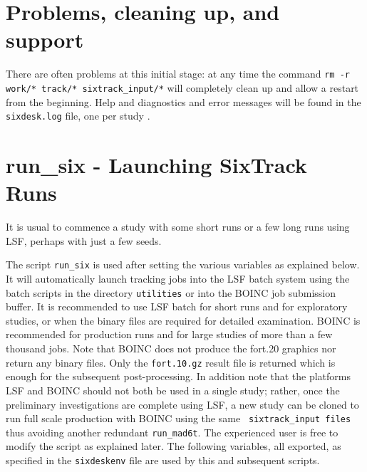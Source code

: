 \documentclass{cernatsnote}
\begin{document}
\section{Problems, cleaning up, and support}

There are often problems at this initial stage: at any time the command {\tt rm
-r work/* track/* sixtrack\_input/*} will completely clean up and allow a
restart from the beginning. Help and diagnostics and error messages will be
found in the {\tt sixdesk.log} file, one per study \footnotemark.

\section{run\_six - Launching SixTrack Runs}
%
\label{sec:run_six}
It is usual to commence a study with some short runs or a few long runs using
LSF, perhaps with just a few seeds.

The script {\tt run\_six} is used after setting the various variables as
explained below.  It will automatically launch tracking jobs into the LSF batch
system using the batch scripts in the directory {\tt utilities} or into the
BOINC job submission buffer.  It is recommended to use LSF batch for short runs
and for exploratory studies, or when the binary files are required for detailed
examination.  BOINC is recommended for production runs and for large studies of
more than a few thousand jobs. Note that BOINC does not produce the fort.20
graphics nor return any binary files. Only the {\tt fort.10.gz}  result file is
returned which is enough for the subsequent post-processing.  In addition note
that the platforms LSF and BOINC should not both be used in a single study;
rather, once the preliminary investigations are complete using LSF, a new study
can be cloned to run full scale production with BOINC using the same {\tt
sixtrack\_input files} thus avoiding another redundant {\tt run\_mad6t}.  The
experienced user is free to modify the script as explained later.  The
following variables, all exported, as specified in the {\tt sixdeskenv} file
are used by this and subsequent scripts.
\end{document}
